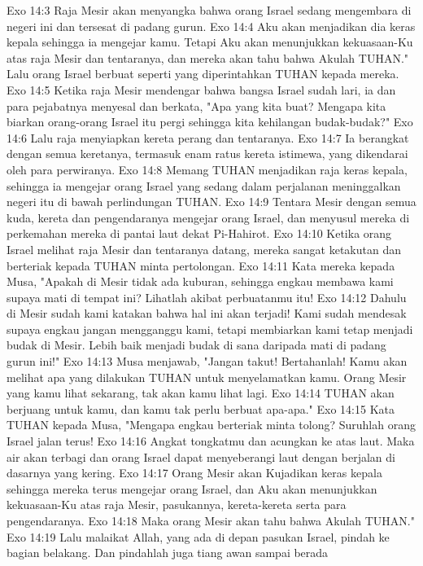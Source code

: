 Exo 14:3  Raja Mesir akan menyangka bahwa orang Israel sedang mengembara di negeri ini dan tersesat di padang gurun.
Exo 14:4  Aku akan menjadikan dia keras kepala sehingga ia mengejar kamu. Tetapi Aku akan menunjukkan kekuasaan-Ku atas raja Mesir dan tentaranya, dan mereka akan tahu bahwa Akulah TUHAN." Lalu orang Israel berbuat seperti yang diperintahkan TUHAN kepada mereka.
Exo 14:5  Ketika raja Mesir mendengar bahwa bangsa Israel sudah lari, ia dan para pejabatnya menyesal dan berkata, "Apa yang kita buat? Mengapa kita biarkan orang-orang Israel itu pergi sehingga kita kehilangan budak-budak?"
Exo 14:6  Lalu raja menyiapkan kereta perang dan tentaranya.
Exo 14:7  Ia berangkat dengan semua keretanya, termasuk enam ratus kereta istimewa, yang dikendarai oleh para perwiranya.
Exo 14:8  Memang TUHAN menjadikan raja keras kepala, sehingga ia mengejar orang Israel yang sedang dalam perjalanan meninggalkan negeri itu di bawah perlindungan TUHAN.
Exo 14:9  Tentara Mesir dengan semua kuda, kereta dan pengendaranya mengejar orang Israel, dan menyusul mereka di perkemahan mereka di pantai laut dekat Pi-Hahirot.
Exo 14:10  Ketika orang Israel melihat raja Mesir dan tentaranya datang, mereka sangat ketakutan dan berteriak kepada TUHAN minta pertolongan.
Exo 14:11  Kata mereka kepada Musa, "Apakah di Mesir tidak ada kuburan, sehingga engkau membawa kami supaya mati di tempat ini? Lihatlah akibat perbuatanmu itu!
Exo 14:12  Dahulu di Mesir sudah kami katakan bahwa hal ini akan terjadi! Kami sudah mendesak supaya engkau jangan mengganggu kami, tetapi membiarkan kami tetap menjadi budak di Mesir. Lebih baik menjadi budak di sana daripada mati di padang gurun ini!"
Exo 14:13  Musa menjawab, "Jangan takut! Bertahanlah! Kamu akan melihat apa yang dilakukan TUHAN untuk menyelamatkan kamu. Orang Mesir yang kamu lihat sekarang, tak akan kamu lihat lagi.
Exo 14:14  TUHAN akan berjuang untuk kamu, dan kamu tak perlu berbuat apa-apa."
Exo 14:15  Kata TUHAN kepada Musa, "Mengapa engkau berteriak minta tolong? Suruhlah orang Israel jalan terus!
Exo 14:16  Angkat tongkatmu dan acungkan ke atas laut. Maka air akan terbagi dan orang Israel dapat menyeberangi laut dengan berjalan di dasarnya yang kering.
Exo 14:17  Orang Mesir akan Kujadikan keras kepala sehingga mereka terus mengejar orang Israel, dan Aku akan menunjukkan kekuasaan-Ku atas raja Mesir, pasukannya, kereta-kereta serta para pengendaranya.
Exo 14:18  Maka orang Mesir akan tahu bahwa Akulah TUHAN."
Exo 14:19  Lalu malaikat Allah, yang ada di depan pasukan Israel, pindah ke bagian belakang. Dan pindahlah juga tiang awan sampai berada
